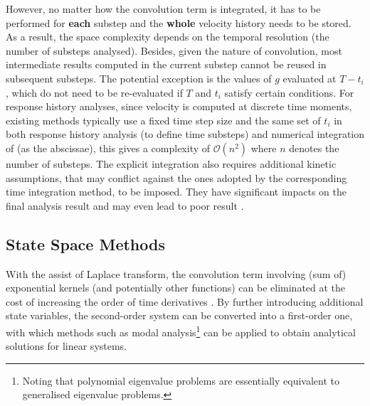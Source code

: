 However, no matter how the convolution term is integrated, it has to be performed for \textbf{each} substep and the \textbf{whole} velocity history needs to be stored. As a result, the space complexity depends on the temporal resolution (the number of substeps analysed). Besides, given the nature of convolution, most intermediate results computed in the current substep cannot be reused in subsequent substeps. The potential exception is the values of $g$ evaluated at $T-t_i$, which do not need to be re-evaluated if $T$ and $t_i$ satisfy certain conditions. For response history analyses, since velocity is computed at discrete time moments, existing methods typically use a fixed time step size and the same set of $t_i$ in both response history analysis (to define time substeps) and numerical integration of  (as the abscissae), this gives a complexity of $\mathcal{O}\left(n^2\right)$ where $n$ denotes the number of substeps. The explicit integration also requires additional kinetic assumptions, that may conflict against the ones adopted by the corresponding time integration method, to be imposed. They have significant impacts on the final analysis result \citep[see][]{Liu2014} and may even lead to poor result \cite[see][Figs. 12, 17, 25, 26]{Liu2023}.
\subsection{State Space Methods}
With the assist of Laplace transform, the convolution term involving (sum of) exponential kernels (and potentially other functions) can be eliminated at the cost of increasing the order of time derivatives \citep[see, e.g.,][]{Wu2019}. By further introducing additional state variables, the second-order system  can be converted into a first-order one, with which methods such as modal analysis\footnote{Noting that polynomial eigenvalue problems are essentially equivalent to generalised eigenvalue problems.} can be applied to obtain analytical solutions for linear systems.

